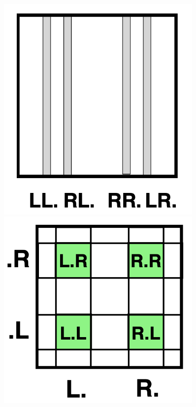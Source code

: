 \documentclass[12pt]{article}
\theoremstyle{plain}
\begin{document}
\begin{figure}[H]
\begin{minipage}[c][0.24\width]{
   0.24\textwidth}
   \includegraphics[width=0.9\textwidth]{figure/section5/horseshoe-2-2.png}
\end{minipage}
\begin{minipage}[c][0.24\width]{
   0.24\textwidth}
   \centering
   \includegraphics[width=0.9\textwidth]{figure/section5/horseshoe-3-1.png}

\end{minipage}
\end{figure}
\end{document}
